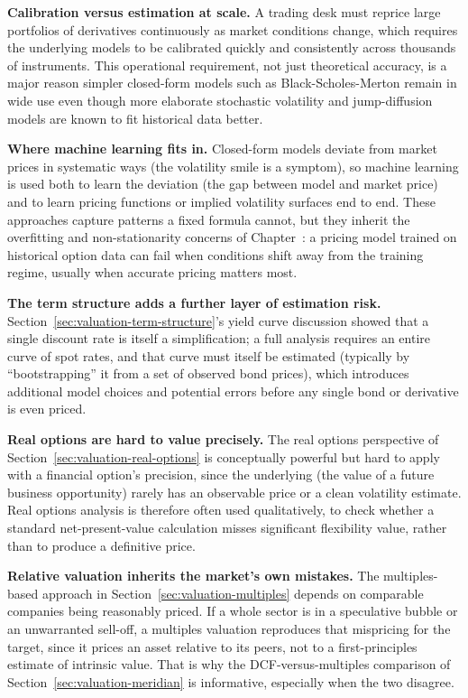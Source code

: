 \documentclass[../ai_in_finance]{subfiles}
\begin{document}
\textbf{Calibration versus estimation at scale.} A trading desk must reprice large portfolios of derivatives continuously as market conditions change, which requires the underlying models to be calibrated quickly and consistently across thousands of instruments. This operational requirement, not just theoretical accuracy, is a major reason simpler closed-form models such as Black-Scholes-Merton remain in wide use even though more elaborate stochastic volatility and jump-diffusion models are known to fit historical data better.

\textbf{Where machine learning fits in.} Closed-form models deviate from market prices in systematic ways (the volatility smile is a symptom), so machine learning is used both to learn the deviation (the gap between model and market price) and to learn pricing functions or implied volatility surfaces end to end. These approaches capture patterns a fixed formula cannot, but they inherit the overfitting and non-stationarity concerns of Chapter~: a pricing model trained on historical option data can fail when conditions shift away from the training regime, usually when accurate pricing matters most.

\textbf{The term structure adds a further layer of estimation risk.} Section~\ref{sec:valuation-term-structure}'s yield curve discussion showed that a single discount rate is itself a simplification; a full analysis requires an entire curve of spot rates, and that curve must itself be estimated (typically by ``bootstrapping'' it from a set of observed bond prices), which introduces additional model choices and potential errors before any single bond or derivative is even priced.

\textbf{Real options are hard to value precisely.} The real options perspective of Section~\ref{sec:valuation-real-options} is conceptually powerful but hard to apply with a financial option's precision, since the underlying (the value of a future business opportunity) rarely has an observable price or a clean volatility estimate. Real options analysis is therefore often used qualitatively, to check whether a standard net-present-value calculation misses significant flexibility value, rather than to produce a definitive price.

\textbf{Relative valuation inherits the market's own mistakes.} The multiples-based approach in Section~\ref{sec:valuation-multiples} depends on comparable companies being reasonably priced. If a whole sector is in a speculative bubble or an unwarranted sell-off, a multiples valuation reproduces that mispricing for the target, since it prices an asset relative to its peers, not to a first-principles estimate of intrinsic value. That is why the DCF-versus-multiples comparison of Section~\ref{sec:valuation-meridian} is informative, especially when the two disagree.
\end{document}
